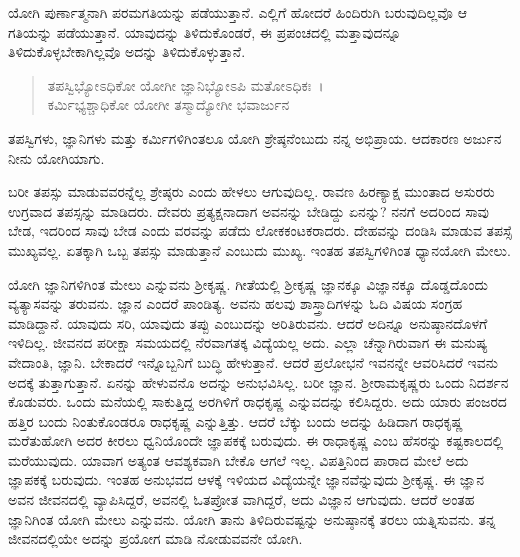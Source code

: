 ಯೋಗಿ ಪುರ್ಣಾತ್ಮನಾಗಿ ಪರಮಗತಿಯನ್ನು ಪಡೆಯುತ್ತಾನೆ. ಎಲ್ಲಿಗೆ ಹೋದರೆ ಹಿಂದಿರುಗಿ ಬರುವುದಿಲ್ಲವೊ ಆ ಗತಿಯನ್ನು ಪಡೆಯುತ್ತಾನೆ. ಯಾವುದನ್ನು ತಿಳಿದುಕೊಂಡರೆ, ಈ ಪ್ರಪಂಚದಲ್ಲಿ ಮತ್ತಾವುದನ್ನೂ ತಿಳಿದುಕೊಳ್ಳಬೇಕಾಗಿಲ್ಲವೊ ಅದನ್ನು ತಿಳಿದುಕೊಳ್ಳುತ್ತಾನೆ.

\begin{verse}
ತಪಸ್ವಿಭ್ಯೋಽಧಿಕೋ ಯೋಗೀ ಜ್ಞಾನಿಭ್ಯೋಽಪಿ ಮತೋಽಧಿಕಃ~।\\ಕರ್ಮಿಭ್ಯಶ್ಚಾಧಿಕೋ ಯೋಗೀ ತಸ್ಮಾದ್ಯೋಗೀ ಭವಾರ್ಜುನ 
\end{verse}

{\small ತಪಸ್ವಿಗಳು, ಜ್ಞಾನಿಗಳು ಮತ್ತು ಕರ್ಮಿಗಳಿಗಿಂತಲೂ ಯೋಗಿ ಶ್ರೇಷ್ಠನೆಂಬುದು ನನ್ನ ಅಭಿಪ್ರಾಯ. ಆದಕಾರಣ ಅರ್ಜುನ ನೀನು ಯೋಗಿಯಾಗು.}

ಬರೀ ತಪಸ್ಸು ಮಾಡುವವರನ್ನೆಲ್ಲ ಶ್ರೇಷ್ಠರು ಎಂದು ಹೇಳಲು ಆಗುವುದಿಲ್ಲ. ರಾವಣ ಹಿರಣ್ಯಾಕ್ಷ ಮುಂತಾದ ಅಸುರರು ಉಗ್ರವಾದ ತಪಸ್ಸನ್ನು ಮಾಡಿದರು. ದೇವರು ಪ್ರತ್ಯಕ್ಷನಾದಾಗ ಅವನನ್ನು ಬೇಡಿದ್ದು ಏನನ್ನು? ನನಗೆ ಅದರಿಂದ ಸಾವು ಬೇಡ, ಇದರಿಂದ ಸಾವು ಬೇಡ ಎಂದು ವರವನ್ನು ಪಡೆದು ಲೋಕಕಂಟಕರಾದರು. ದೇಹವನ್ನು ದಂಡಿಸಿ ಮಾಡುವ ತಪಸ್ಸೆ ಮುಖ್ಯವಲ್ಲ. ಏತಕ್ಕಾಗಿ ಒಬ್ಬ ತಪಸ್ಸು ಮಾಡುತ್ತಾನೆ ಎಂಬುದು ಮುಖ್ಯ. ಇಂತಹ ತಪಸ್ವಿಗಳಿಗಿಂತ ಧ್ಯಾನಯೋಗಿ ಮೇಲು.

ಯೋಗಿ ಜ್ಞಾನಿಗಳಿಗಿಂತ ಮೇಲು ಎನ್ನುವನು ಶ‍್ರೀಕೃಷ್ಣ. ಗೀತೆಯಲ್ಲಿ ಶ‍್ರೀಕೃಷ್ಣ ಜ್ಞಾನಕ್ಕೂ ವಿಜ್ಞಾನಕ್ಕೂ ದೊಡ್ಡದೊಂದು ವ್ಯತ್ಯಾಸವನ್ನು ತರುವನು. ಜ್ಞಾನ ಎಂದರೆ ಪಾಂಡಿತ್ಯ. ಅವನು ಹಲವು ಶಾಸ್ತ್ರಾದಿಗಳನ್ನು ಓದಿ ವಿಷಯ ಸಂಗ್ರಹ ಮಾಡಿದ್ದಾನೆ. ಯಾವುದು ಸರಿ, ಯಾವುದು ತಪ್ಪು ಎಂಬುದನ್ನು ಅರಿತಿರುವನು. ಆದರೆ ಅದಿನ್ನೂ ಅನುಷ್ಠಾನದೊಳಗೆ ಇಳಿದಿಲ್ಲ. ಜೀವನದ ಪರೀಕ್ಷಾ ಸಮಯದಲ್ಲಿ ನೆರವಾಗತಕ್ಕ ವಿದ್ಯೆಯಲ್ಲ ಅದು. ಎಲ್ಲಾ ಚೆನ್ನಾಗಿರುವಾಗ ಈ ಮನುಷ್ಯ ವೇದಾಂತಿ, ಜ್ಞಾನಿ. ಬೇಕಾದರೆ ಇನ್ನೊಬ್ಬನಿಗೆ ಬುದ್ಧಿ ಹೇಳುತ್ತಾನೆ. ಆದರೆ ಪ್ರಲೋಭನೆ ಇವನನ್ನೇ ಆವರಿಸಿದರೆ ಇವನು ಅದಕ್ಕೆ ತುತ್ತಾಗುತ್ತಾನೆ. ಏನನ್ನು ಹೇಳುವನೊ ಅದನ್ನು ಅನುಭವಿಸಿಲ್ಲ. ಬರೀ ಜ್ಞಾನ. ಶ‍್ರೀರಾಮಕೃಷ್ಣರು ಒಂದು ನಿದರ್ಶನ ಕೊಡುವರು. ಒಂದು ಮನೆಯಲ್ಲಿ ಸಾಕುತ್ತಿದ್ದ ಅರಗಿಳಿಗೆ ರಾಧಕೃಷ್ಣ ಎನ್ನುವದನ್ನು ಕಲಿಸಿದ್ದರು. ಅದು ಯಾರು ಪಂಜರದ ಹತ್ತಿರ ಬಂದು ನಿಂತುಕೊಂಡರೂ ರಾಧಕೃಷ್ಣ ಎನ್ನುತ್ತಿತ್ತು. ಆದರೆ ಬೆಕ್ಕು ಬಂದು ಅದನ್ನು ಹಿಡಿದಾಗ ರಾಧಕೃಷ್ಣ ಮರೆತುಹೋಗಿ ಅದರ ಕೀರಲು ಧ್ವನಿಯೊಂದೇ ಜ್ಞಾಪಕಕ್ಕೆ ಬರುವುದು. ಈ ರಾಧಾಕೃಷ್ಣ ಎಂಬ ಹೆಸರನ್ನು ಕಷ್ಟಕಾಲದಲ್ಲಿ ಮರೆಯುವುದು. ಯಾವಾಗ ಅತ್ಯಂತ ಆವಶ್ಯಕವಾಗಿ ಬೇಕೊ ಆಗಲೆ ಇಲ್ಲ. ವಿಪತ್ತಿನಿಂದ ಪಾರಾದ ಮೇಲೆ ಅದು ಜ್ಞಾಪಕಕ್ಕೆ ಬರುವುದು. ಇಂತಹ ಅನುಭವದ ಆಳಕ್ಕೆ ಇಳಿಯದ ವಿದ್ಯೆಯನ್ನೇ ಜ್ಞಾನವೆನ್ನುವುದು ಶ‍್ರೀಕೃಷ್ಣ. ಈ ಜ್ಞಾನ ಅವನ ಜೀವನದಲ್ಲಿ ವ್ಯಾಪಿಸಿದ್ದರೆ, ಅವನಲ್ಲಿ ಓತಪ್ರೋತ ವಾಗಿದ್ದರೆ, ಅದು ವಿಜ್ಞಾನ ಆಗುವುದು. ಆದರೆ ಅಂತಹ ಜ್ಞಾನಿಗಿಂತ ಯೋಗಿ ಮೇಲು ಎನ್ನುವನು. ಯೋಗಿ ತಾನು ತಿಳಿದಿರುವಷ್ಟನ್ನು ಅನುಷ್ಠಾನಕ್ಕೆ ತರಲು ಯತ್ನಿಸುವನು. ತನ್ನ ಜೀವನದಲ್ಲಿಯೇ ಅದನ್ನು ಪ್ರಯೋಗ ಮಾಡಿ ನೋಡುವವನೇ ಯೋಗಿ.

